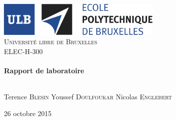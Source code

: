 \begin{titlepage}
\begin{center}

\includegraphics[width=0.6\textwidth]{logoulb2}~\\[1cm]

\textsc{\LARGE Université libre de Bruxelles}\\[1.5cm]

\textsc{ \Large ELEC-H-300 }\\[1cm]
\HRule \\[0.4cm]
{ \LARGE \textbf{Rapport de laboratoire}\\[0.4cm] }

\HRule \\[1cm]
Terence \textsc{Blesin}\hspace{1cm}  Youssef \textsc{Doulfoukar}\hspace{1cm}  Nicolas \textsc{Englebert}
\vfill

{\large 26 octobre 2015}



\end{center}
\end{titlepage}
